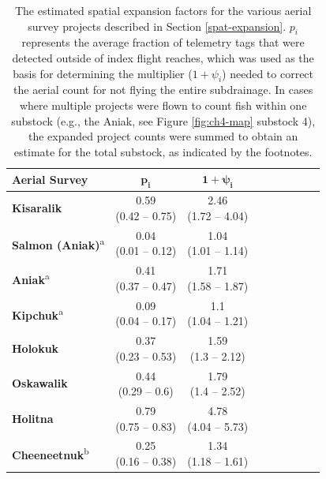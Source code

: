 \documentclass[12pt,]{book}
\theoremstyle{definition}
\theoremstyle{definition}
\theoremstyle{definition}
\theoremstyle{remark}
\begin{document}
\begin{table}

\caption{\label{tab:spat-expand-table}The estimated spatial expansion factors for the various aerial survey projects described in Section \ref{spat-expansion}. $p_i$ represents the average fraction of telemetry tags that were detected outside of index flight reaches, which was used as the basis for determining the multiplier ($1 + \psi_i$) needed to correct the aerial count for not flying the entire subdrainage. In cases where multiple projects were flown to count fish within one substock (e.g., the Aniak, see Figure \ref{fig:ch4-map} substock 4), the expanded project counts were summed to obtain an estimate for the total substock, as indicated by the footnotes.}
\centering
\begin{tabular}[t]{lcclcclcc}
\toprule
\textbf{Aerial Survey} & $\boldsymbol{p_i}$ & $\boldsymbol{1 + \psi_i}$\\
\midrule
\textbf{Kisaralik} & \makecell[c]{0.59\\(0.42 -- 0.75)} & \makecell[c]{2.46\\(1.72 -- 4.04)}\\
\textbf{Salmon (Aniak)}\textsuperscript{a} & \makecell[c]{0.04\\(0.01 -- 0.12)} & \makecell[c]{1.04\\(1.01 -- 1.14)}\\
\textbf{Aniak}\textsuperscript{a} & \makecell[c]{0.41\\(0.37 -- 0.47)} & \makecell[c]{1.71\\(1.58 -- 1.87)}\\
\textbf{Kipchuk}\textsuperscript{a} & \makecell[c]{0.09\\(0.04 -- 0.17)} & \makecell[c]{1.1\\(1.04 -- 1.21)}\\
\textbf{Holokuk} & \makecell[c]{0.37\\(0.23 -- 0.53)} & \makecell[c]{1.59\\(1.3 -- 2.12)}\\
\textbf{Oskawalik} & \makecell[c]{0.44\\(0.29 -- 0.6)} & \makecell[c]{1.79\\(1.4 -- 2.52)}\\
\textbf{Holitna} & \makecell[c]{0.79\\(0.75 -- 0.83)} & \makecell[c]{4.78\\(4.04 -- 5.73)}\\
\textbf{Cheeneetnuk}\textsuperscript{b} & \makecell[c]{0.25\\(0.16 -- 0.38)} & \makecell[c]{1.34\\(1.18 -- 1.61)}\\

\end{tabular}
\end{table}
\end{document}

